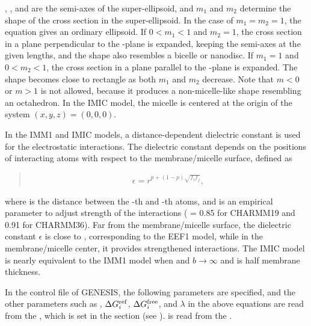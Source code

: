\documentclass[a4paper,11pt,oneside,english]{sphinxmanual}
\begin{document}
, , and  are the semi-axes of the super-ellipsoid, and
\(m_1\) and \(m_2\) determine the shape of the cross section in the super-ellipsoid.
In the case of \(m_1 = m_2 = 1\), the equation gives an ordinary ellipsoid.
If \(0 < m_1 < 1\) and \(m_2 = 1\), the cross section in a plane perpendicular to
the -plane is expanded, keeping the semi-axes at the given lengths,
and the shape also resembles a bicelle or nanodisc.
If \(m_1 = 1\) and \(0 < m_2 < 1\), the cross section in a plane parallel to the -plane is expanded.
The shape becomes close to rectangle as both \(m_1\) and \(m_2\) decrease.
Note that \(m < 0\) or \(m > 1\) is not allowed, because it produces a non-micelle-like shape resembling an octahedron.
In the IMIC model, the micelle is centered at the origin of the system \((x, y, z) = (0, 0, 0)\).

In the IMM1 and IMIC models, a distance-dependent dielectric constant is used for the electrostatic interactions.
The dielectric constant depends on the positions of interacting atoms with respect to the membrane/micelle surface, defined as
\begin{quote}

\vspace{-5mm}
\begin{equation*}
\begin{split}\epsilon = r^{ p + (1 - p) {\sqrt {f_i f_j}}},\end{split}
\end{equation*}
\vspace{-3mm}
\end{quote}

where  is the distance between the -th and -th atoms, and  is an empirical parameter to adjust strength
of the interactions ( = 0.85 for CHARMM19 and 0.91 for CHARMM36).
Far from the membrane/micelle surface, the dielectric constant \(\epsilon\) is close to , corresponding to the EEF1 model,
while in the membrane/micelle center, it provides strengthened interactions.
The IMIC model is nearly equivalent to the IMM1 model when  and \(b \rightarrow \infty\)  and  is half membrane thickness.

In the control file of GENESIS, the following parameters are specified,
and the other parameters such as , \(\Delta {G_i^{{\rm{ref}}}}\),
\(\Delta {G_i^{{\rm{free}}}}\), and \(\lambda\) in the above equations
are read from the , which is set in the \sphinxstylestrong{{[}INPUT{]}} section (see {\hyperref[\detokenize{03_Input:input}]{}}).
 is read from the .
\end{document}
